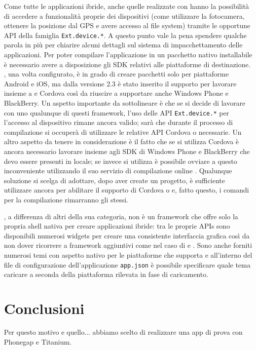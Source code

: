 			Come tutte le applicazioni ibride, anche quelle realizzate con
			\senchat{} hanno la possibilità di accedere a funzionalità proprie
			dei dispositivi (come utilizzare la fotocamera, ottenere la posizione
			dal GPS e avere accesso al file sys\-tem) tramite le opportune API
			della famiglia \verb|Ext.device.*|. A questo punto vale la pena
			spendere qualche parola in più per chiarire alcuni dettagli sul
			sistema di impacchettamento delle applicazioni. Per poter compilare
			l'applicazione in un pacchetto nativo installabile è necessario
			avere a disposizione gli SDK relativi alle piattaforme di destinazione.
			\senchacmd{}, una volta configurato, è in grado di creare pacchetti
			solo per piattaforme Android e iOS, ma dalla versione 2.3 è stato
			inserito il supporto per lavorare insieme a \pg{} e Cordova così da
			riuscire a supportare anche Windows Phone e BlackBerry. Un aspetto
			importante da sottolineare è che se si decide di lavorare con uno
			qualunque di questi framework, l'uso delle API \verb|Ext.device.*| per
			l'accesso al dispositivo rimane ancora valido; sarà \senchacmd{} che
			durante il processo di compilazione si occuperà di utilizzare le
			relative API Cordova o \pg{} necessarie. Un altro aspetto da
			tenere in considerazione è il fatto che se si utilizza Cordova è
			ancora necessario lavorare insieme agli SDK di Windows Phone e BlackBerry
			che devo essere presenti in locale; se invece si utilizza \pg{} è
			possibile ovviare a questo inconveniente utilizzando il suo servizio
			di compilazione online \pgb{}. Qualunque soluzione si scelga di
			adottare, dopo aver create un progetto, è sufficiente utilizzare
			ancora \senchacmd{} per abilitare il supporto di Cordova o \pg{} e,
			fatto questo, i comandi per la compilazione rimarranno gli stessi.
			
			\senchat{}, a differenza di altri della sua categoria, non è un
			framework che offre	solo la propria shell nativa per creare
			applicazioni ibride: tra le	proprie APIs sono disponibili numerosi
			widgets per creare una consistente interfaccia grafica così da non
			dover ricorrere a framework aggiuntivi come nel caso di \pg{} e \rhom{}.
			Sono anche forniti numerosi temi con aspetto nativo per le piattaforme
			che supporta e all'interno del file di configurazione
			dell'applicazione \verb|app.json| è possibile specificare quale tema
			caricare a seconda della piattaforma rilevata in fase di caricamento.
			
			
	
	\section{Conclusioni}
		Per questo motivo e quello... abbiamo scelto di realizzare una app di 
		prova con Phonegap e Titanium.
